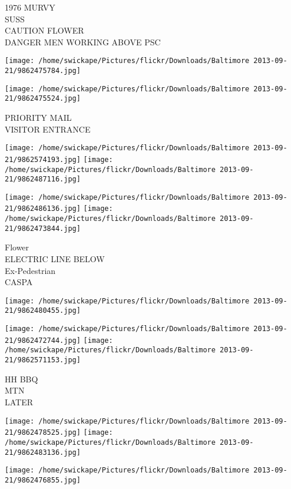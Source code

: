 \documentclass[10pt,letterpaper]{article}
\begin{document}
1976 MURVY\\
SUSS\\
CAUTION FLOWER\\
DANGER MEN WORKING ABOVE PSC\\
\pagebreak

\texttt{[image: /home/swickape/Pictures/flickr/Downloads/Baltimore 2013-09-21/9862475784.jpg]}

\vspace{0.25in}
\texttt{[image: /home/swickape/Pictures/flickr/Downloads/Baltimore 2013-09-21/9862475524.jpg]}

PRIORITY MAIL\\
VISITOR ENTRANCE\\
\pagebreak

\texttt{[image: /home/swickape/Pictures/flickr/Downloads/Baltimore 2013-09-21/9862574193.jpg]}
\texttt{[image: /home/swickape/Pictures/flickr/Downloads/Baltimore 2013-09-21/9862487116.jpg]}

\texttt{[image: /home/swickape/Pictures/flickr/Downloads/Baltimore 2013-09-21/9862486136.jpg]}
\texttt{[image: /home/swickape/Pictures/flickr/Downloads/Baltimore 2013-09-21/9862473844.jpg]}

Flower\\
ELECTRIC LINE BELOW\\
Ex{-}Pedestrian\\
CASPA\\
\pagebreak

\texttt{[image: /home/swickape/Pictures/flickr/Downloads/Baltimore 2013-09-21/9862480455.jpg]}

\vspace{0.25in}
\texttt{[image: /home/swickape/Pictures/flickr/Downloads/Baltimore 2013-09-21/9862472744.jpg]}
\texttt{[image: /home/swickape/Pictures/flickr/Downloads/Baltimore 2013-09-21/9862571153.jpg]}

HH BBQ\\
MTN\\
LATER\\
\pagebreak

\texttt{[image: /home/swickape/Pictures/flickr/Downloads/Baltimore 2013-09-21/9862478525.jpg]}
\texttt{[image: /home/swickape/Pictures/flickr/Downloads/Baltimore 2013-09-21/9862483136.jpg]}

\vspace{0.25in}
\texttt{[image: /home/swickape/Pictures/flickr/Downloads/Baltimore 2013-09-21/9862476855.jpg]}
\end{document}
